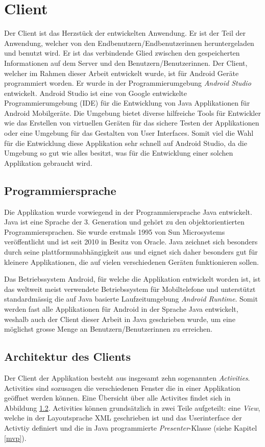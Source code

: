 \documentclass[a4paper,11pt]{report}
\begin{document}
		\section{Client} \label{client}
		Der Client ist das Herzstück der entwickelten Anwendung. Er ist der Teil der Anwendung, welcher von den Endbenutzern/Endbenutzerinnen heruntergeladen und benutzt wird. Er ist das verbindende Glied zwischen den gespeicherten Informationen auf dem Server und den Benutzern/Benutzerinnen. Der Client, welcher im Rahmen dieser Arbeit entwickelt wurde, ist für Android Geräte programmiert worden. Er wurde in der Programmierumgebung \emph{Android Studio} entwickelt. Android Studio ist eine von Google entwickelte Programmierumgebung (IDE) für die Entwicklung von Java Applikationen für Android Mobilgeräte. Die Umgebung bietet diverse hilfreiche Tools für Entwickler wie das Erstellen von virtuellen  Geräten für das sichere Testen der Applikationen oder eine Umgebung für das Gestalten von User Interfaces. Somit viel die Wahl für die Entwicklung diese Applikation sehr schnell auf Android Studio, da die Umgebung so gut wie alles besitzt, was für die Entwicklung einer solchen Applikation gebraucht wird.
			\subsection{Programmiersprache}
			Die Applikation wurde vorwiegend in der Programmiersprache Java entwickelt. Java ist eine Sprache der 3. Generation und gehört zu den objektorientierten Programmiersprachen. Sie wurde erstmals 1995 von Sun Microsystems veröffentlicht und ist seit 2010 in Besitz von Oracle. Java zeichnet sich besonders durch seine plattformunabhängigkeit aus und eignet sich daher besonders gut für kleinere Applikationen, die auf vielen verschiedenen Geräten funktionieren sollen.
			
			 Das Betriebssystem Android, für welche die Applikation entwickelt worden ist, ist das weltweit meist verwendete Betriebssystem für Mobiltelefone und unterstützt standardmässig die auf Java basierte Laufzeitumgebung \emph{Android Runtime}. Somit werden fast alle Applikationen für Android in der Sprache Java entwickelt, weshalb auch der Client dieser Arbeit in Java geschrieben wurde, um eine möglichst grosse Menge an Benutzern/Benutzerinnen zu erreichen.\cite{android}
			\subsection{Architektur des Clients} %
			Der Client der Applikation besteht aus insgesamt zehn sogenannten \emph{Activities}. Activities sind sozusagen die verschiedenen Fenster die in einer Applikation geöffnet werden können. Eine Übersicht über alle Activites findet sich in Abbildung \ref{}. Activities können grundsätzlich in zwei Teile aufgeteilt: eine \emph{View}, welche in der Layoutsprache XML geschrieben ist und das Userinterface der Activtiy definiert und die in Java programmierte \emph{Presenter}-Klasse (siehe Kapitel \ref{mvp}).
				
\end{document}
